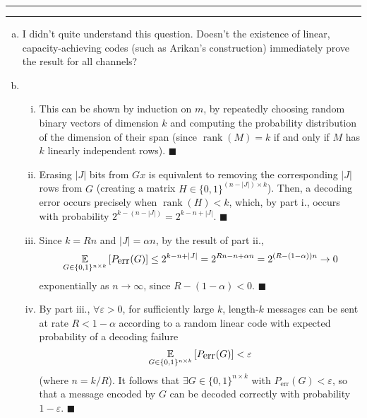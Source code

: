 \documentclass[11pt]{article}
\newcounter{questionCounter}
\newcounter{partCounter}[questionCounter]
\newenvironment{question}[2][\arabic{questionCounter}]{%
    \setcounter{partCounter}{0}%
    \vspace{.25in} \hrule \vspace{0.5em}%
        \noindent{\bf #2}%
    \vspace{0.8em} \hrule \vspace{.10in}%
    \addtocounter{questionCounter}{1}%
}{}
\renewcommand{\qed}{\quad $\blacksquare$}
\newcommand{\rank}{\operatorname{rank}} %
\newcommand{\e}{\varepsilon} %
\newcommand{\E}[2]{\operatornamewithlimits{\mathbb{E}}_{#2}\left[ #1 \right]}
\begin{document}
\begin{question}{Problem 4}
\begin{enumerate}[(a)]
\item
I didn't quite understand this question. Doesn't the existence of linear,
capacity-achieving codes (such as Arikan's construction) immediately prove the
result for all channels?

\item
\begin{enumerate}[i.]
\item
This can be shown by induction on $m$, by repeatedly choosing random binary
vectors of dimension $k$ and computing the probability distribution of the
dimension of their span (since $\rank (M) = k$ if and only if $M$ has
$k$ linearly independent rows). \qed

\item Erasing $|J|$ bits from $Gx$ is equivalent to removing the corresponding
$|J|$ rows from $G$ (creating a matrix $H \in \{0,1\}^{(n - |J|) \times k}$).
Then, a decoding error occurs precisely when $\rank(H) < k$, which, by part i.,
occurs with probability $2^{k - (n - |J|)} = 2^{k - n + |J|}$. \qed

\item Since $k = Rn$ and $|J| = \alpha n$, by the result
of part ii.,
\[
 \E{P_{\mbox{err}}(G)}{G \in \{0,1\}^{n \times k}}
 \leq 2^{k - n + |J|}
 = 2^{Rn - n + \alpha n}
 = 2^{(R - (1 - \alpha))n} \rightarrow 0
\]
exponentially as $n \rightarrow \infty$, since $R - (1 - \alpha) < 0$. \qed

\item By part iii., $\forall \e > 0$, for sufficiently large $k$, length-$k$
messages can be sent at rate $R < 1 - \alpha$ according to a random linear code
with expected probability of a decoding failure
\[
 \E{P_{\mbox{err}}(G)}{G \in \{0,1\}^{n \times k}} < \e
\]
(where $n = k/R$). It follows that $\exists G \in \{0,1\}^{n \times k}$ with
$P_{\mbox{err}}(G) < \e$, so that a message encoded by $G$ can be decoded
correctly with probability $1 - \e$. \qed
\end{enumerate}

\end{enumerate}
\end{question}
\end{document}
